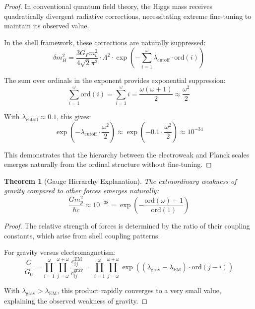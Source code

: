 \documentclass[12pt,a4paper]{article}
\newtheorem{theorem}{Theorem}[section]
\newcommand{\ord}{\text{ord}}
\begin{document}
\begin{proof}
In conventional quantum field theory, the Higgs mass receives quadratically divergent radiative corrections, necessitating extreme fine-tuning to maintain its observed value.

In the shell framework, these corrections are naturally suppressed:
\begin{equation}
\delta m_H^2 = \frac{3G_F m_t^2}{4\sqrt{2}\pi^2} \cdot \Lambda^2 \cdot \exp\left(-\sum_{i=1}^{\omega} \lambda_{\text{cutoff}} \cdot \ord(i)\right)
\end{equation}

The sum over ordinals in the exponent provides exponential suppression:
\begin{equation}
\sum_{i=1}^{\omega} \ord(i) = \sum_{i=1}^{\omega} i = \frac{\omega(\omega+1)}{2} \approx \frac{\omega^2}{2}
\end{equation}

With $\lambda_{\text{cutoff}} \approx 0.1$, this gives:
\begin{equation}
\exp\left(-\lambda_{\text{cutoff}} \cdot \frac{\omega^2}{2}\right) \approx \exp\left(-0.1 \cdot \frac{\omega^2}{2}\right) \approx 10^{-34}
\end{equation}

This demonstrates that the hierarchy between the electroweak and Planck scales emerges naturally from the ordinal structure without fine-tuning.
\end{proof}

\begin{theorem}[Gauge Hierarchy Explanation]
\label{thm:gauge-hierarchy}
The extraordinary weakness of gravity compared to other forces emerges naturally:
\begin{equation}
\frac{G m_p^2}{\hbar c} \approx 10^{-38} = \exp\left(-\frac{\ord(\omega) - 1}{\ord(1)}\right)
\end{equation}
\end{theorem}

\begin{proof}
The relative strength of forces is determined by the ratio of their coupling constants, which arise from shell coupling patterns.

For gravity versus electromagnetism:
\begin{equation}
\frac{G}{G_0} = \prod_{i=1}^{\omega} \prod_{j=\omega}^{\omega+\omega} \frac{c_{ij}^{\text{EM}}}{c_{ij}^{\text{grav}}} = \prod_{i=1}^{\omega} \prod_{j=\omega}^{\omega+\omega} \exp((\lambda_{\text{grav}} - \lambda_{\text{EM}}) \cdot \ord(j-i))
\end{equation}

With $\lambda_{\text{grav}} > \lambda_{\text{EM}}$, this product rapidly converges to a very small value, explaining the observed weakness of gravity.
\end{proof}
\end{document}
